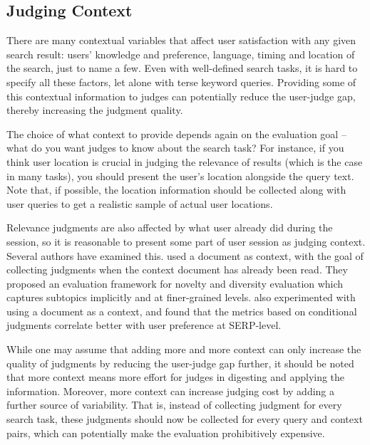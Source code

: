 \subsection{Judging Context}
\label{s:judging-context}
There are many contextual variables that affect user satisfaction with any given search result: users' knowledge and preference, language, timing and location of the search, just to name a few. Even with well-defined search tasks, it is hard to specify all these factors, let alone with terse keyword queries. Providing some of this contextual information to judges can potentially reduce the user-judge gap, thereby increasing the judgment quality.  

The choice of what context to provide depends again on the evaluation goal -- what do you want judges to know about the search task? For instance, if you think user location is crucial in judging the relevance of results (which is the case in many tasks), you should present the user's location alongside the query text. Note that, if possible, the location information should be collected along with user queries to get a realistic sample of actual user locations.

Relevance judgments are also affected by what user already did during the session, so it is reasonable to present some part of user session as judging context. Several authors have examined this. \cite{Chandar2013} used a document as context, with the goal of collecting judgments when the context document has already been read. They proposed an evaluation framework for novelty and diversity evaluation which captures
subtopics implicitly and at finer-grained levels. \cite{Golbus:2014:CDR} also experimented with using a document as a context, and found that the metrics based on conditional judgments correlate better with user preference at SERP-level. 

While one may assume that adding more and more context can only increase the quality of judgments by reducing the user-judge gap further, it should be noted that more context means more effort for judges in digesting and applying the information. Moreover, more context can increase judging cost by adding a further source of variability. That is, instead of collecting judgment for every search task, these judgments should now be collected for every query and context pairs, which can potentially make the evaluation prohibitively expensive.

